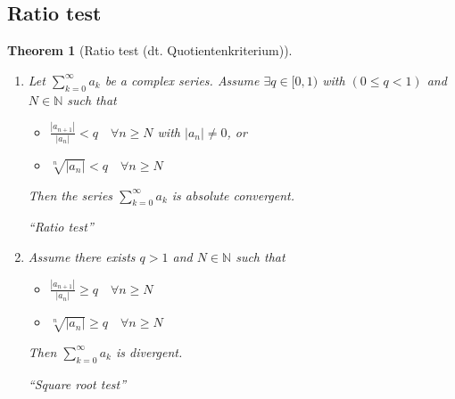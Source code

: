 \documentclass[a4paper,landscape,twocolumn]{article}
\newtheorem{theorem}{Theorem}
\newcommand\abs[1]{\left|#1\right|}
\begin{document}
\subsection{Ratio test}
\begin{theorem}[Ratio test (dt. \foreignlanguage{ngerman}{Quotientenkriterium})]
  \begin{enumerate}
    \item
      Let $\sum_{k=0}^\infty a_k$ be a complex series.
      Assume $\exists q \in [0, 1)$ with $(0 \leq q < 1)$ and $N \in \mathbb N$ such that
      \begin{itemize}
        \item $\frac{\abs{a_{n+1}}}{\abs{a_n}} < q \quad \forall n \geq N$ with $\abs{a_n} \neq 0$, or
        \item $\sqrt[n]{\abs{a_n}} < q \quad \forall n \geq N$
      \end{itemize}
      Then the series $\sum_{k=0}^\infty a_k$ is absolute convergent.
      \begin{center}
        \enquote{Ratio test}
      \end{center}
    \item
      Assume there exists $q > 1$ and $N \in \mathbb N$ such that
      \begin{itemize}
        \item $\frac{\abs{a_{n+1}}}{\abs{a_n}} \geq q \quad \forall n \geq N$
        \item $\sqrt[n]{\abs{a_n}} \geq q \quad \forall n \geq N$
      \end{itemize}
      Then $\sum_{k=0}^\infty a_k$ is divergent.
      \begin{center}
        \enquote{Square root test}
      \end{center}
  \end{enumerate}
\end{theorem}
\end{document}
